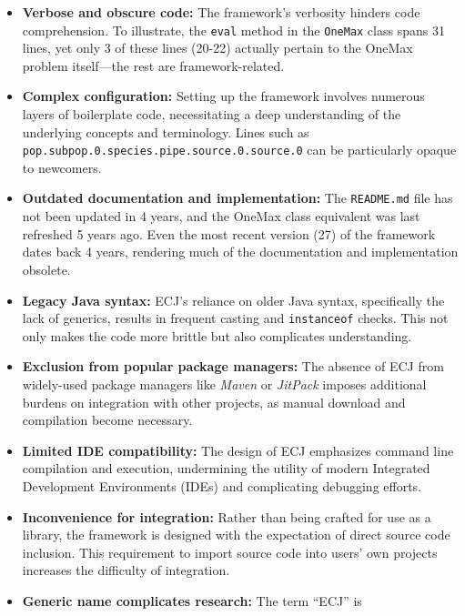   \begin{itemize}
    \item \textbf{Verbose and obscure code:} The framework's verbosity hinders 
      code comprehension.
      To illustrate, the \texttt{eval} method in the \texttt{OneMax} class 
      spans 31 lines, yet only 3 of these lines (20-22) actually pertain to the 
      OneMax problem itself—the rest are framework-related.
    \item \textbf{Complex configuration:} Setting up the framework involves 
      numerous layers of boilerplate code, necessitating a deep understanding 
      of the underlying concepts and terminology.
      Lines such as 
      \texttt{pop.subpop.0.species.pipe.source.0.source.0} can be 
      particularly opaque to newcomers.
    \item \textbf{Outdated documentation and implementation:} The 
      \texttt{README.md} file has not been updated in 4 years, and the OneMax 
      class equivalent was last refreshed 5 years ago.
      Even the most recent version (27) of the framework dates back 4 years, 
      rendering much of the documentation and implementation obsolete.
    \item \textbf{Legacy Java syntax:} ECJ's reliance on older Java syntax, 
      specifically the lack of generics, results in frequent casting and 
      \texttt{instanceof} checks.
      This not only makes the code more brittle but also complicates 
      understanding.
    \item \textbf{Exclusion from popular package managers:} The absence of ECJ 
      from widely-used package managers like \textit{Maven} or \textit{JitPack} 
      imposes additional burdens on integration with other projects, as manual 
      download and compilation become necessary.
    \item \textbf{Limited IDE compatibility:} The design of ECJ emphasizes 
      command line compilation and execution, undermining the utility of modern 
      Integrated Development Environments (IDEs) and complicating debugging 
      efforts.
    \item \textbf{Inconvenience for integration:} Rather than being crafted for 
      use as a library, the framework is designed with the expectation of 
      direct source code inclusion.
      This requirement to import source code into users' own projects increases 
      the difficulty of integration.
    \item \textbf{Generic name complicates research:} The term \enquote{ECJ} is 

\end{itemize}
